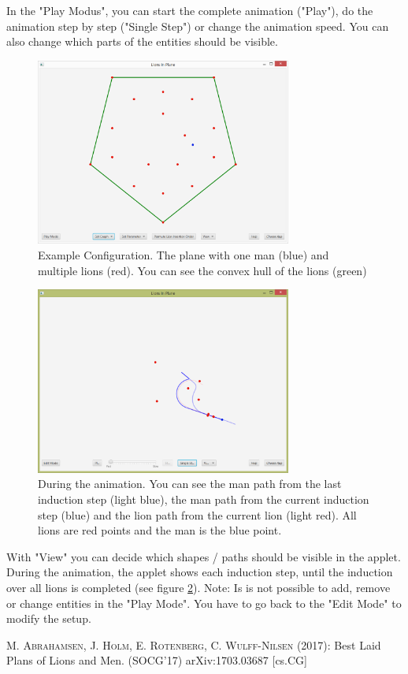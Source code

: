 \documentclass[a4paper]{article}
\begin{document}
In the "Play Modus", you can start the complete animation ("Play"), do the animation step by step ("Single Step") or change the animation speed. You can also change which parts of the entities should be visible.\\

\begin{figure}[hbt]
  \centering
    \includegraphics[width=0.75\textwidth]{planeApplet.PNG}
  \caption{Example Configuration. The plane with one man (blue) and multiple lions (red). You can see the convex hull of the lions (green)}
  \label{fig:planeApplet}
\end{figure}
\begin{figure}[hbt]
  \centering
    \includegraphics[width=0.75\textwidth]{planeAppletRun.PNG}
  \caption{During the animation. You can see the man path from the last induction step (light blue), the man path from the current induction step (blue) and the lion path from the current lion (light red). All lions are red points and the man is the blue point.}
  \label{fig:planeAppletRun}
\end{figure}

With "View" you can decide which shapes / paths should be visible in the applet. During the animation, the applet shows each induction step, until the induction over all lions is completed (see figure \ref{fig:planeAppletRun}). Note: Is is not possible to add, remove or change entities in the "Play Mode". You have to go back to the "Edit Mode" to modify the setup.



\newpage
	\begin{thebibliography}{99}
		
		
		 \textsc{M. Abrahamsen, J. Holm, E. Rotenberg, C. Wulff-Nilsen} (2017): Best Laid Plans of Lions and Men. (SOCG'17) arXiv:1703.03687 [cs.CG]

	

		
	\end{thebibliography} 
\end{document}
